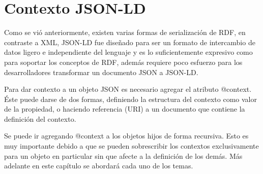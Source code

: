 \section{Contexto JSON-LD}

Como se vió anteriormente, existen varias formas de serialización de RDF, en contraste a XML, JSON-LD fue diseñado para ser un formato de intercambio de datos ligero e independiente del lenguaje y es lo suficientemente expresivo como para soportar los conceptos de RDF, además requiere poco esfuerzo para los desarrolladores transformar un documento JSON a JSON-LD. 

Para dar contexto a un objeto JSON es necesario agregar el atributo @context. Éste puede darse de dos formas, definiendo la estructura del contexto como valor de la propiedad, o haciendo referencia (URI) a un documento que contiene la definición del contexto.

Se puede ir agregando @context a los objetos hijos de forma recursiva. Esto es muy importante debido a que se pueden sobrescribir los contextos exclusivamente para un objeto en particular sin que afecte a la definición de los demás. Más adelante en este capítulo se abordará cada uno de los temas.



 